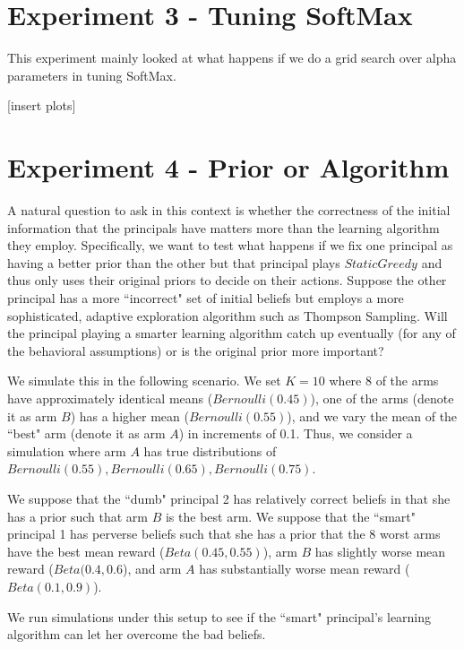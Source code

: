 \documentclass[11pt,letterpaper]{article}
\begin{document}
\section*{Experiment 3 - Tuning SoftMax} %
This experiment mainly looked at what happens if we do a grid search over alpha parameters in tuning SoftMax. %

[insert plots]
\section*{Experiment 4 - Prior or Algorithm}
A natural question to ask in this context is whether the correctness of the initial information that the principals have matters more than the learning algorithm they employ. Specifically, we want to test what happens if we fix one principal as having a better prior than the other but that principal plays $StaticGreedy$ and thus only uses their original priors to decide on their actions.   Suppose the other principal has a more ``incorrect" set of initial beliefs but employs a more sophisticated, adaptive exploration algorithm such as Thompson Sampling. Will the principal playing a smarter learning algorithm catch up eventually (for any of the behavioral assumptions) or is the original prior more important?

We simulate this in the following scenario. We set $K = 10$ where 8 of the arms have approximately identical means ($Bernoulli(0.45)$), one of the arms (denote it as arm $B$) has a higher mean ($Bernoulli(0.55)$), and we vary the mean of the ``best" arm (denote it as arm $A$) in increments of 0.1. Thus, we consider a simulation where arm $A$ has true distributions of $Bernoulli(0.55), Bernoulli(0.65), Bernoulli(0.75)$.

We suppose that the ``dumb" principal 2 has relatively correct beliefs in that she has a prior such that arm $B$ is the best arm. We suppose that the ``smart" principal 1 has perverse beliefs such that she has a prior that the 8 worst arms have the best mean reward ($Beta(0.45, 0.55)$), arm $B$ has slightly worse mean reward ($Beta(0.4, 0.6$), and arm $A$ has substantially worse mean reward ($Beta(0.1, 0.9)$).

We run simulations under this setup to see if the ``smart" principal's learning algorithm can let her overcome the bad beliefs.
\end{document}
